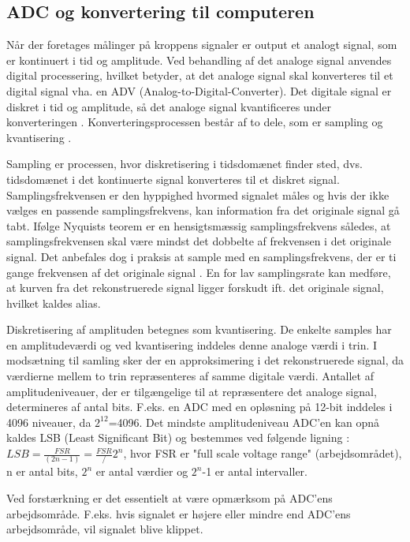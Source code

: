 \subsection{ADC og konvertering til computeren}
Når der foretages målinger på kroppens signaler er output et analogt signal, som er kontinuert i tid og amplitude. Ved behandling af det analoge signal anvendes digital processering, hvilket betyder, at det analoge signal skal konverteres til et digital signal vha. en ADV (Analog-to-Digital-Converter). Det digitale signal er diskret i tid og amplitude, så det analoge signal kvantificeres under konverteringen \cite{Webster2009}. Konverteringsprocessen består af to dele, som er sampling og kvantisering \cite{Zouridakis2003}.  

Sampling er processen, hvor diskretisering i tidsdomænet finder sted, dvs. tidsdomænet i det kontinuerte signal konverteres til et diskret signal. Samplingsfrekvensen er den hyppighed hvormed signalet måles og hvis der ikke vælges en passende samplingsfrekvens, kan information fra det originale signal gå tabt. Ifølge Nyquists teorem er en hensigtsmæssig samplingsfrekvens således, at samplingsfrekvensen skal være mindst det dobbelte af frekvensen i det originale signal. \cite{Zouridakis2003} Det anbefales dog i praksis at sample med en samplingsfrekvens, der er ti gange frekvensen af det originale signal . En for lav samplingsrate kan medføre, at kurven fra det rekonstruerede signal ligger forskudt ift. det originale signal, hvilket kaldes alias. \cite{Zouridakis2003}
 
Diskretisering af amplituden betegnes som kvantisering. De enkelte samples har en amplitudeværdi og ved kvantisering inddeles denne analoge værdi i trin. I modsætning til samling sker der en approksimering i det rekonstruerede signal, da værdierne mellem to trin repræsenteres af samme digitale værdi. \cite{Zouridakis2003} Antallet af amplitudeniveauer, der er tilgængelige til at repræsentere det analoge signal, determineres af antal bits. F.eks. en ADC med en opløsning på 12-bit inddeles i 4096 niveauer, da $2^12$=4096. \cite{Konrad2006} Det mindste amplitudeniveau ADC'en kan opnå kaldes LSB (Least Significant Bit) og bestemmes ved følgende ligning : $LSB = \frac{FSR}{(2n-1)} = \frac{FSR}/{2^n}$, hvor FSR er "full scale voltage range" (arbejdsområdet), n er antal bits, $2^n$ er antal værdier og $2^n$-1 er antal intervaller. 

Ved forstærkning er det essentielt at være opmærksom på ADC'ens  arbejdsområde. F.eks. hvis signalet er højere eller mindre end ADC'ens arbejdsområde, vil signalet blive klippet.  
 